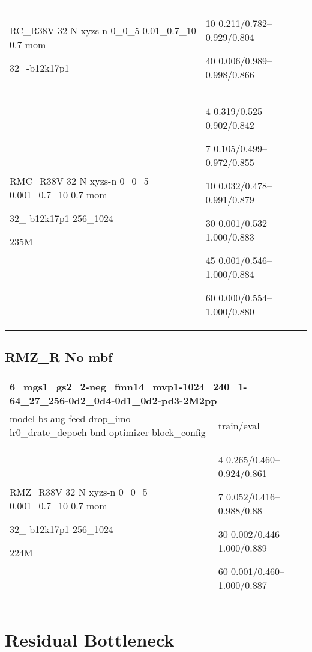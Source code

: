 \documentclass[,table,dvipsnames]{article}
\begin{document}
\begin{tabular}{|p{10cm}|p{5cm}| }
	\rowcolor{yellow!20}
	RC\_R38V 32 N xyzs-n 0\_0\_5 0.01\_0.7\_10 0.7 mom \par 32\_-b12k17p1& 10 0.211/0.782--0.929/0.804\par 40 0.006/0.989--0.998/0.866\\
	
	\rowcolor{blue!20}
	RMC\_R38V 32 N xyzs-n 0\_0\_5 0.001\_0.7\_10 0.7 mom \par 32\_-b12k17p1 256\_1024\par 235M& 
	4 0.319/0.525--0.902/0.842\par 7 0.105/0.499--0.972/0.855\par 10 0.032/0.478--0.991/0.879\par 30 0.001/0.532--1.000/0.883\par 45 0.001/0.546--1.000/0.884\par 60 0.000/0.554--1.000/0.880\\
	\hline 
\end{tabular}

\subsection{RMZ\_R No mbf}
\noindent\begin{tabular}{|p{10cm}|p{5cm}| }	
	\hline
	\multicolumn{2}{|p{15cm}|}{ 6\_mgs1\_gs2\_2-neg\_fmn14\_mvp1-1024\_240\_1-64\_27\_256-0d2\_0d4-0d1\_0d2-pd3-2M2pp}\\
	\hline
	model bs aug feed drop\_imo lr0\_drate\_depoch bnd optimizer block\_config & train/eval \\
	
	\rowcolor{red!20}
	RMZ\_R38V 32 N xyzs-n 0\_0\_5 0.001\_0.7\_10 0.7 mom \par 32\_-b12k17p1 256\_1024\par 224M& 4 0.265/0.460--0.924/0.861\par 7 0.052/0.416--0.988/0.88\par 30 0.002/0.446--1.000/0.889\par 60 0.001/0.460--1.000/0.887\\
	\hline 
\end{tabular}

\section{Residual Bottleneck}
\end{document}
